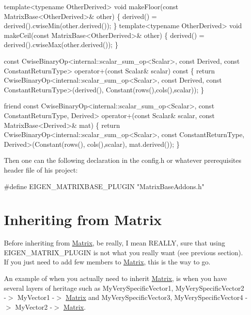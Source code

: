 \begin{DoxyCode}
\textcolor{keyword}{template}<\textcolor{keyword}{typename} OtherDerived>
\textcolor{keywordtype}{void} makeFloor(\textcolor{keyword}{const} MatrixBase<OtherDerived>& other) \{ derived() = derived().cwiseMin(other.derived()); \}
\textcolor{keyword}{template}<\textcolor{keyword}{typename} OtherDerived>
\textcolor{keywordtype}{void} makeCeil(\textcolor{keyword}{const} MatrixBase<OtherDerived>& other) \{ derived() = derived().cwiseMax(other.derived()); \}

\textcolor{keyword}{const} CwiseBinaryOp<internal::scalar\_sum\_op<Scalar>, \textcolor{keyword}{const} Derived, \textcolor{keyword}{const} ConstantReturnType>
operator+(\textcolor{keyword}{const} Scalar& scalar)\textcolor{keyword}{ const}
\textcolor{keyword}{}\{ \textcolor{keywordflow}{return} CwiseBinaryOp<internal::scalar\_sum\_op<Scalar>, \textcolor{keyword}{const} Derived, \textcolor{keyword}{const} ConstantReturnType>(derived(),
       Constant(rows(),cols(),scalar)); \}

\textcolor{keyword}{friend} \textcolor{keyword}{const} CwiseBinaryOp<internal::scalar\_sum\_op<Scalar>, \textcolor{keyword}{const} ConstantReturnType, Derived>
operator+(\textcolor{keyword}{const} Scalar& scalar, \textcolor{keyword}{const} MatrixBase<Derived>& mat)
\{ \textcolor{keywordflow}{return} CwiseBinaryOp<internal::scalar\_sum\_op<Scalar>, \textcolor{keyword}{const} ConstantReturnType, Derived>(Constant(rows(),
      cols(),scalar), mat.derived()); \}
\end{DoxyCode}


Then one can the following declaration in the config.\+h or whatever prerequisites header file of his project\+: 
\begin{DoxyCode}
\textcolor{preprocessor}{#define EIGEN\_MATRIXBASE\_PLUGIN "MatrixBaseAddons.h"}
\end{DoxyCode}
 \hypertarget{TopicCustomizing_InheritingMatrix}{}\section{Inheriting from Matrix}\label{TopicCustomizing_InheritingMatrix}
Before inheriting from \hyperlink{group___core___module_class_eigen_1_1_matrix}{Matrix}, be really, I mean R\+E\+A\+L\+LY, sure that using E\+I\+G\+E\+N\+\_\+\+M\+A\+T\+R\+I\+X\+\_\+\+P\+L\+U\+G\+IN is not what you really want (see previous section). If you just need to add few members to \hyperlink{group___core___module_class_eigen_1_1_matrix}{Matrix}, this is the way to go.

An example of when you actually need to inherit \hyperlink{group___core___module_class_eigen_1_1_matrix}{Matrix}, is when you have several layers of heritage such as My\+Very\+Specific\+Vector1, My\+Very\+Specific\+Vector2 -\/$>$ My\+Vector1 -\/$>$ \hyperlink{group___core___module_class_eigen_1_1_matrix}{Matrix} and My\+Very\+Specific\+Vector3, My\+Very\+Specific\+Vector4 -\/$>$ My\+Vector2 -\/$>$ \hyperlink{group___core___module_class_eigen_1_1_matrix}{Matrix}.

